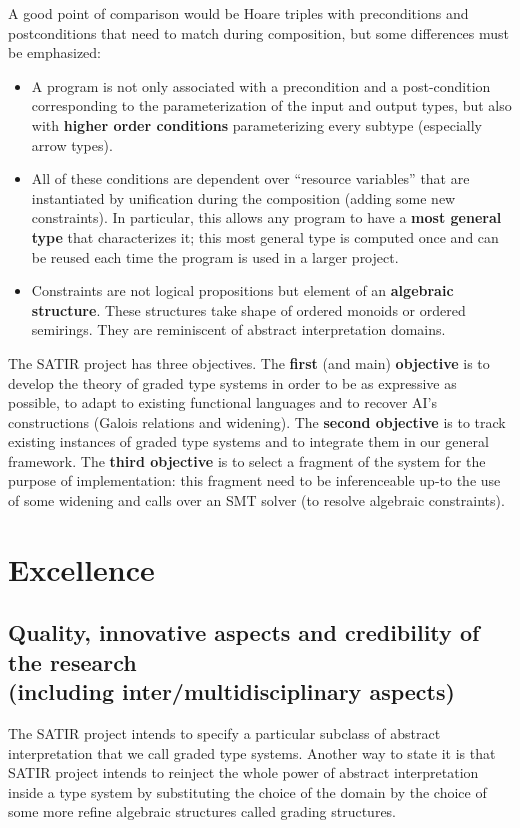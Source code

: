 \documentclass{article}[11pt]
\begin{document}
A good point of comparison would be Hoare triples with preconditions and postconditions that need to match during composition, but some differences must be emphasized:
\begin{itemize}
\item A program is not only associated with a precondition and a post-condition corresponding to the parameterization of the input and output types, but also with {\bf higher order conditions} parameterizing every subtype (especially arrow types).
\item All of these conditions are dependent over ``resource variables'' that are instantiated by unification during the composition (adding some new constraints). In particular, this allows any program to have a {\bf most general type} that characterizes it; this most general type is computed once and can be reused each time the program is used in a larger project.
\item Constraints are not logical propositions but element of an {\bf algebraic structure}. These structures take shape of ordered monoids or ordered semirings. They are reminiscent of abstract interpretation domains.
\end{itemize}

The SATIR project has three objectives. The {\bf first} (and main) {\bf objective} is to develop the theory of graded type systems in order to be as expressive as possible, to adapt to existing functional languages and to recover AI's constructions (Galois relations and widening). The {\bf second objective} is to track existing instances of graded type systems and to integrate them in our general framework. The {\bf third objective} is to select a fragment of the system for the purpose of implementation: this fragment need to be inferenceable up-to the use of some widening and calls over an SMT solver (to resolve algebraic constraints).

\section{Excellence}
\subsection{Quality, innovative aspects and credibility of the research\\  (including inter/multidisciplinary aspects)}

The SATIR project intends to specify a particular subclass of abstract interpretation that we call graded type systems. Another way to state it is that SATIR project intends to reinject the whole power of abstract interpretation inside a type system by substituting the choice of the domain by the choice of some more refine algebraic structures called grading structures.
\end{document}
